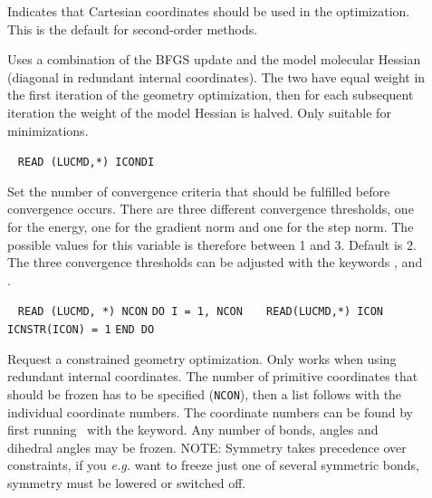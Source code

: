 \begin{description}
\item[]
Indicates that Cartesian coordinates
should be used in the optimization. This is the default for
second-order methods.

\item[]
Uses a combination of the BFGS update and the model molecular Hessian (diagonal
in redundant internal coordinates). The two have equal weight in the
first iteration of the geometry optimization, then for each subsequent
iteration the weight of the model Hessian is halved. Only suitable for
minimizations.

\item[]\verb| | \newline
\verb|READ (LUCMD,*) ICONDI|

Set the number of convergence criteria
that should be fulfilled before
convergence occurs. There are three different convergence thresholds,
one for the energy, one for the gradient
norm and one for the step
norm.
The possible values for this variable is therefore between 1 and
3. Default is 2. The three convergence thresholds can be adjusted with
the keywords ,  and .

\item[]\verb| |\newline
\verb|READ (LUCMD, *) NCON|\newline
\verb|DO I = 1, NCON|\newline
\verb|   READ(LUCMD,*) ICON|\newline
\verb|   ICNSTR(ICON) = 1|\newline
\verb|END DO|

Request a constrained geometry optimization. Only works when using
redundant internal coordinates. The number of primitive coordinates
that should be frozen has to be specified (\verb|NCON|), then a list
follows with the individual coordinate numbers. The coordinate numbers
can be found by first running \dalton\ with the 
keyword. Any number of bonds, angles and dihedral angles may be
frozen. NOTE: Symmetry takes precedence over constraints, if you
{\it e.g.\/} want to freeze just one of several symmetric bonds, symmetry
must be lowered or switched off.


\end{description}
